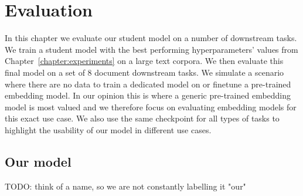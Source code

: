 \chapter{Evaluation}\label{chapter:evaluation}

In this chapter we evaluate our student model on a number of downstream tasks.
We train a student model with the best performing hyperparameters' values from
Chapter~\ref{chapter:experiments} on a large text corpora. We then evaluate this
final model on a set of 8 document downstream tasks. We simulate a scenario
where there are no data to train a dedicated model on or finetune a pre-trained
embedding model. In our opinion this is where a generic pre-trained embedding
model is most valued and we therefore focus on evaluating embedding models for
this exact use case. We also use the same checkpoint for all types of tasks to
highlight the usability of our model in different use cases.

\section{Our model}

TODO: think of a name, so we are not constantly labelling it "our"




